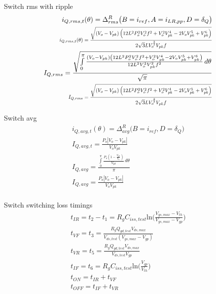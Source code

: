 \documentclass[12pt]{report}
\begin{document}
Switch rms with ripple
\begin{align}
i_{Q,rms,t}(\theta) = \Delta^R_{rms} \big(B=i_{ref},A=i_{LR,pp},D=\delta_{Q} \big)\\
\text{\scalebox{0.75}{$i_{Q,rms,t}(\theta) = \frac{\sqrt{\left(V_{o} - V_{pk}\right) \left(12 L^{2} P_{o}^{2} V_{o}^{2} f^{2} + V_{o}^{2} V_{pk}^{4} - 2 V_{o} V_{pk}^{5} + V_{pk}^{6}\right)}}{2 \sqrt{3} L V_{o}^{\frac{3}{2}} V_{pk} f}$}}\\
I_{Q,rms} = \frac{\sqrt{\int\limits_{0}^{\pi} \frac{\left(V_{o} - V_{pk}\right) \left(12 L^{2} P_{o}^{2} V_{o}^{2} f^{2} + V_{o}^{2} V_{pk}^{4} - 2 V_{o} V_{pk}^{5} + V_{pk}^{6}\right)}{12 L^{2} V_{o}^{3} V_{pk}^{2} f^{2}}\, d\theta}}{\sqrt{\pi}}\\
\text{\scalebox{0.75}{$I_{Q,rms} = \frac{\sqrt{\left(V_{o} - V_{pk}\right) \left(12 L^{2} P_{o}^{2} V_{o}^{2} f^{2} + V_{o}^{2} V_{pk}^{4} - 2 V_{o} V_{pk}^{5} + V_{pk}^{6}\right)}}{2 \sqrt{3} L V_{o}^{\frac{3}{2}} V_{pk} f}$}}\\
\end{align}

Switch avg
\begin{align}
i_{Q,avg,t}(\theta) = \Delta^R_{avg} \big(B=i_{ref}, D=\delta_{Q} \big)\\
I_{Q,avg,t} = \frac{P_{o} \left|{V_{o} - V_{pk}}\right|}{V_{o} V_{pk}}\\
I_{Q,avg} = \frac{\int\limits_{0}^{\pi} \frac{P_{o} \left(1 - \frac{V_{pk}}{V_{o}}\right)}{V_{pk}}\, d\theta}{\pi}\\
I_{Q,avg} = \frac{P_{o} \left|{V_{o} - V_{pk}}\right|}{V_{o} V_{pk}}\\
\end{align}

Switch switching loss timings
\begin{align}
t_{IR} = t_{2} - t_{1} = R_{g}C_{iss,test}\text{ln}\bigg(\frac{V_{gs,max}-V_{th}}{V_{gs,max}-V_{gp}}\bigg)\\
t_{VF} = t_{3} = \frac{R_{g}Q_{gd,test}V_{ds,max}}{V_{ds,test}(V_{gs,max} - V_{gp})}\\
t_{VR} = t_{5} = \frac{R_{g}Q_{gd,test}V_{ds,max}}{V_{ds,test}V_{gp}}\\
t_{IF} = t_{6} = R_{g}C_{iss,test}\text{ln}\bigg(\frac{V_{gp}}{V_{th}}\bigg)\\
t_{ON} = t_{IR} + t_{VF}\\
t_{OFF} = t_{IF} + t_{VR}\\
\end{align}
\end{document}
